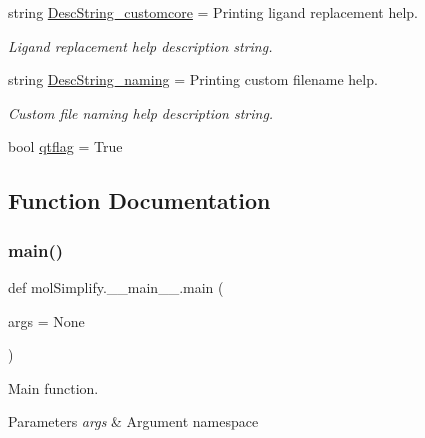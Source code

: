 \begin{DoxyCompactItemize}
string \hyperlink{namespacemolSimplify_1_1____main_____a496fa81c1389ea0f803ba654a8f34d13}{Desc\+String\+\_\+customcore} = \textquotesingle{}Printing ligand replacement help.\textquotesingle{}
\begin{DoxyCompactList}\small\item\em Ligand replacement help description string. \end{DoxyCompactList}\item 
string \hyperlink{namespacemolSimplify_1_1____main_____a8f8d451490e4ae14efb40374fd9774f2}{Desc\+String\+\_\+naming} = \textquotesingle{}Printing custom filename help.\textquotesingle{}
\begin{DoxyCompactList}\small\item\em Custom file naming help description string. \end{DoxyCompactList}\item 
bool \hyperlink{namespacemolSimplify_1_1____main_____a014c496de4ba28be70d30b5c0b77919b}{qtflag} = True
\end{DoxyCompactItemize}


\subsection{Function Documentation}
\mbox{\label{namespacemolSimplify_1_1____main_____ac0957a328f374bc27d3a68abb201da04}} 
\subsubsection{\texorpdfstring{main()}{main()}}
{\footnotesize\ttfamily def mol\+Simplify.\+\_\+\+\_\+main\+\_\+\+\_\+.\+main (\begin{DoxyParamCaption}\item[{}]{args = {\ttfamily None} }\end{DoxyParamCaption})}



Main function. 


\begin{DoxyParams}{Parameters}
{\em args} & Argument namespace \\
\hline
\end{DoxyParams}


